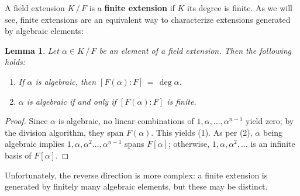 \documentclass[11pt]{article}
\newtheorem{lemma}{Lemma}
\begin{document}
A field extension $K \, / \, F$ is a \textbf{finite extension} if $K$ its degree is finite. As we will see, finite extensions are an equivalent way to characterize extensions generated by algebraic elements:

\begin{adjustwidth}{0.5cm}{}
  \begin{lemma}
    Let $\alpha \in K \, / \, F$ be an element of a field extension. Then the following holds:
    \begin{enumerate}
      \item If $\alpha$ is algebraic, then $[F(\alpha) : F] \, = \, \deg \alpha$.
      \item $\alpha$ is algebraic if and only if $[F(\alpha) : F]$ is finite.
    \end{enumerate}
  \end{lemma}
  \begin{proof}
    Since $\alpha$ is algebraic, no linear combinations of $1, \alpha, \ldots, \alpha^{n - 1}$ yield zero; by the division algorithm, they span $F(\alpha)$. This yields (1). As per (2), $\alpha$ being algebraic implies $1, \alpha, \alpha^{2} \ldots, \alpha^{n - 1}$ spans $F[\alpha]$; otherwise, $1, \alpha, \alpha^{2}, \ldots$ is an infinite basis of $F[\alpha]$.
  \end{proof}
\end{adjustwidth}

Unfortunately, the reverse direction is more complex: a finite extension is generated by finitely many algebraic elements, but these may be distinct.
\end{document}
